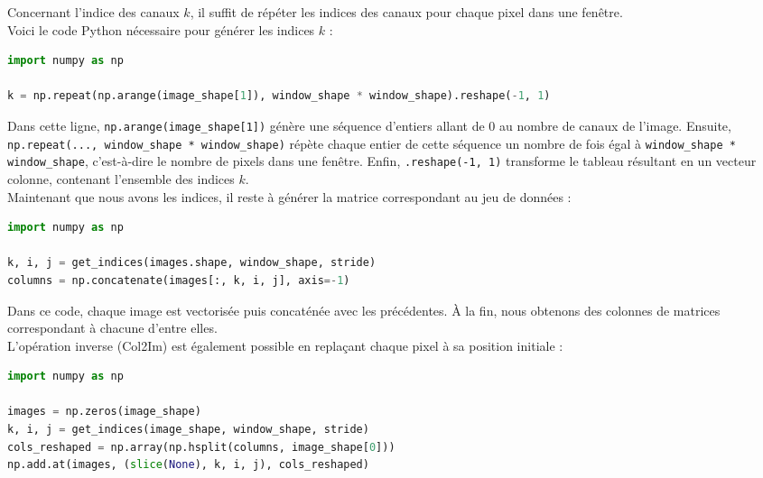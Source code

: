 \begin{multicols}{2}
Concernant l’indice des canaux  $k$, il suffit de répéter les indices des canaux pour 
chaque pixel dans une fenêtre. \\

Voici le code Python nécessaire pour générer les indices $k$ : \\

\begin{lstlisting}[language=Python]
import numpy as np

k = np.repeat(np.arange(image_shape[1]), window_shape * window_shape).reshape(-1, 1)  
\end{lstlisting}
\hfill\break

Dans cette ligne, \texttt{np.arange(image\_shape[1])} génère une séquence d’entiers allant
de 0 au nombre de canaux de l’image. Ensuite, \texttt{np.repeat(..., window\_shape * window\_shape)} répète chaque entier de 
cette séquence un nombre de fois égal à \texttt{window\_shape * window\_shape}, c’est-à-dire le nombre de pixels dans une fenêtre.
Enfin, \texttt{.reshape(-1, 1)} transforme le tableau résultant en un vecteur colonne, contenant l'ensemble
des indices $k$. \\

Maintenant que nous avons les indices, il reste à générer la matrice 
correspondant au jeu de données :\\

\begin{lstlisting}[language=Python]
import numpy as np

k, i, j = get_indices(images.shape, window_shape, stride)
columns = np.concatenate(images[:, k, i, j], axis=-1)
\end{lstlisting}

Dans ce code, chaque image est vectorisée puis concaténée avec les précédentes. 
À la fin, nous obtenons des colonnes de matrices correspondant à chacune d'entre elles. \\

L'opération inverse (Col2Im) est également possible en replaçant chaque pixel 
à sa position initiale :

\begin{lstlisting}[language=Python]
import numpy as np

images = np.zeros(image_shape)
k, i, j = get_indices(image_shape, window_shape, stride)
cols_reshaped = np.array(np.hsplit(columns, image_shape[0]))
np.add.at(images, (slice(None), k, i, j), cols_reshaped)
\end{lstlisting}


\end{multicols}
